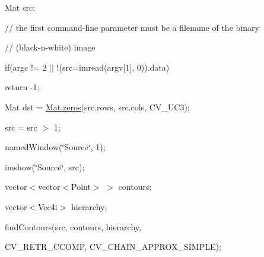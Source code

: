 {\ttfamily Mat src;}

{\ttfamily }

{\ttfamily }

{\ttfamily // the first command-\/line parameter must be a filename of the binary}

{\ttfamily }

{\ttfamily }

{\ttfamily // (black-\/n-\/white) image}

{\ttfamily }

{\ttfamily }

{\ttfamily if(argc != 2 $\vert$$\vert$ !(src=imread(argv\mbox{[}1\mbox{]}, 0)).data)}

{\ttfamily }

{\ttfamily }

{\ttfamily return -\/1;}

{\ttfamily }

{\ttfamily }

{\ttfamily Mat dst = \mbox{\hyperlink{classorg_1_1opencv_1_1core_1_1_mat_aff41070138369b96f792b19f01ab00d9}{Mat.\+zeros}}(src.\+rows, src.\+cols, C\+V\+\_\+U\+C3);}

{\ttfamily }

{\ttfamily }

{\ttfamily src = src $>$ 1;}

{\ttfamily }

{\ttfamily }

{\ttfamily named\+Window(\char`\"{}\+Source\char`\"{}, 1);}

{\ttfamily }

{\ttfamily }

{\ttfamily imshow(\char`\"{}\+Source\char`\"{}, src);}

{\ttfamily }

{\ttfamily }

{\ttfamily vector$<$vector$<$\+Point$>$ $>$ contours;}

{\ttfamily }

{\ttfamily }

{\ttfamily vector$<$\+Vec4i$>$ hierarchy;}

{\ttfamily }

{\ttfamily }

{\ttfamily find\+Contours(src, contours, hierarchy,}

{\ttfamily }

{\ttfamily }

{\ttfamily C\+V\+\_\+\+R\+E\+T\+R\+\_\+\+C\+C\+O\+MP, C\+V\+\_\+\+C\+H\+A\+I\+N\+\_\+\+A\+P\+P\+R\+O\+X\+\_\+\+S\+I\+M\+P\+LE);}

